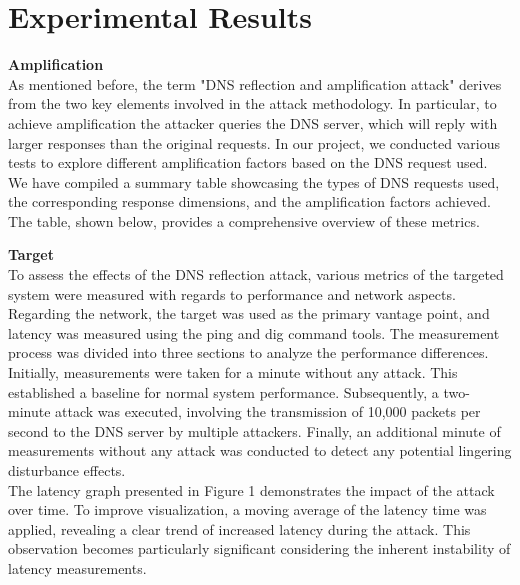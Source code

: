 \section{Experimental Results}
\noindent \textbf{Amplification}\\
As mentioned before, the term "DNS reflection and amplification attack" derives from the two key elements involved in the attack methodology. In particular, to achieve amplification the attacker queries the DNS server, which will reply with larger responses than the original requests. In our project, we conducted various tests to explore different amplification factors based on the DNS request used.\\
We have compiled a summary table showcasing the types of DNS requests used, the corresponding response dimensions, and the amplification factors achieved. The table, shown below, provides a comprehensive overview of these metrics.
\begin{table}[H]
    \centering
    \label{tab:dns-amplification}
\end{table}
\noindent \textbf{Target}\\
To assess the effects of the DNS reflection attack, various metrics of the targeted system were measured with regards to performance and network aspects. Regarding the network, the target was used as the primary vantage point, and latency was measured using the ping and dig command tools. The measurement process was divided into three sections to analyze the performance differences. Initially, measurements were taken for a minute without any attack. This established a baseline for normal system performance. Subsequently, a two-minute attack was executed, involving the transmission of 10,000 packets per second to the DNS server by multiple attackers. Finally, an additional minute of measurements without any attack was conducted to detect any potential lingering disturbance effects.\\
The latency graph presented in Figure 1 demonstrates the impact of the attack over time. To improve visualization, a moving average of the latency time was applied, revealing a clear trend of increased latency during the attack. This observation becomes particularly significant considering the inherent instability of latency measurements.



